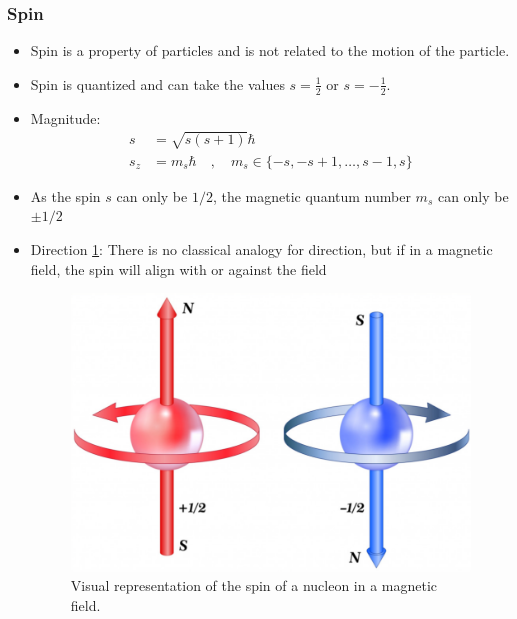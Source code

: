 \subsubsection{Spin}
\begin{itemize}
    \item Spin is a property of particles and is not related to the motion of the particle. 
    \item Spin is quantized and can take the values $s = \frac{1}{2}$ or $s = -\frac{1}{2}$.
    \item Magnitude: 
    \begin{align}
    s &= \sqrt{s(s+1)}ℏ \\
    s_z &= m_sℏ \quad , \quad m_s ∈ \{-s, -s+1, \ldots, s-1, s\} 
    \end{align} 
    \item As the spin $s$ can only be $1 / 2$, the magnetic quantum number $m_s$ can only be $\pm 1 / 2$
    \item Direction \cref{fig: spin_direction}: There is no classical analogy for direction, but if in a magnetic field, the spin will align with or against the field 
    \begin{figure}[h!]
    \centering
    \includegraphics[width = .75\textwidth]{spin_direction.png}
    \caption{Visual representation of the spin of a nucleon in a magnetic field.}
    \label{fig: spin_direction}
    \end{figure}
\end{itemize}
\newpage
